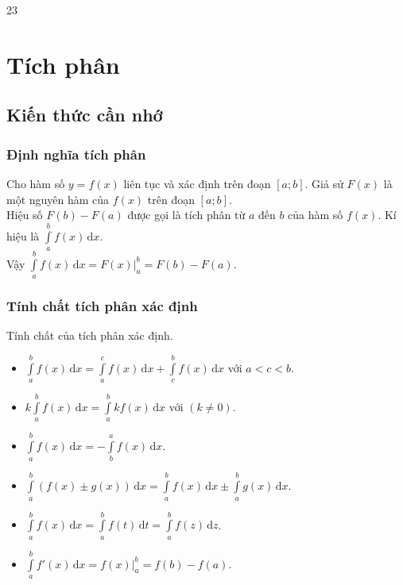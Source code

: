 \setcounter {section} {23}
\setcounter{ex}{0}
\section{Tích phân}
\subsection{Kiến thức cần nhớ}
\begin{khung}
	\subsubsection{Định nghĩa tích phân}
	Cho hàm số $y=f(x)$ liên tục và xác định trên đoạn $[a;b]$. Giả sử $F(x)$ là một nguyên hàm của $f(x)$ trên đoạn $[a;b]$. \\ Hiệu số $F(b)-F(a)$ được gọi là tích phân từ $a$ đến $b$ của hàm số $f(x)$. Kí hiệu là $\displaystyle\int\limits_a^b f(x)\mathrm{\,d}x$.\\
	Vậy $\displaystyle\int\limits_a^b f(x)\mathrm{\,d}x= F(x)\bigg|_a^b=F(b)-F(a)$.\\ 
	\subsubsection{Tính chất tích phân xác định} Tính chất của tích phân xác định.
	\begin{itemize}
		\item $\displaystyle\int\limits_a^b f(x)\mathrm{\,d}x=\displaystyle\int\limits_a^c f(x)\mathrm{\,d}x+\displaystyle\int\limits_c^b f(x)\mathrm{\,d}x$ với $a<c<b$.
		\item $k\displaystyle\int\limits_a^b f(x)\mathrm{\,d}x=\displaystyle\int\limits_a^b kf(x)\mathrm{\,d}x$ với $(k\neq 0)$.
		\item $\displaystyle\int\limits_a^b f(x)\mathrm{\,d}x=-\displaystyle\int\limits_b^a f(x)\mathrm{\,d}x$.
		\item $\displaystyle\int\limits_a^b\left(f(x) \pm g(x)\right)\mathrm{\,d}x=\displaystyle\int\limits_a^b f(x)\mathrm{\,d}x \pm \displaystyle\int\limits_a^b g(x)\mathrm{\,d}x$.
		\item $\displaystyle\int\limits_a^b f(x)\mathrm{\,d}x=\displaystyle\int\limits_a^b f(t)\mathrm{\,d}t=\displaystyle\int\limits_a^b f(z) \mathrm{\,d}z$.
		\item $\displaystyle\int\limits_a^b f'(x)\mathrm{\,d}x= f(x)\bigg|_a^b=f(b)-f(a)$.
	\end{itemize}
\end{khung}
